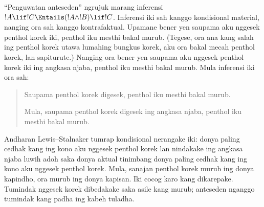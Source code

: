 \documentclass[../../../include/open-logic-section]{subfiles}
\begin{document}


``Penguwatan anteseden'' ngrujuk marang inferensi
$!A \lif !C \Entails (!A \land !B) \lif !C$. Inferensi iki sah
kanggo kondisional material, nanging ora sah kanggo kontrafaktual.
Upamane bener yen saupama aku nggesek penthol korek iki, penthol
iku mesthi bakal murub. (Tegese, ora ana kang salah ing penthol
korek utawa lumahing bungkus korek, aku ora bakal mecah penthol
korek, lan sapiturute.) Nanging ora bener yen saupama aku
nggesek penthol korek iki ing angkasa njaba, penthol iku mesthi
bakal murub. Mula inferensi iki ora sah:
\begin{quote}
  Saupama penthol korek digesek, penthol iku mesthi bakal murub.

  Mula, saupama penthol korek digesek ing angkasa njaba,
  penthol iku mesthi bakal murub.
\end{quote}

Andharan Lewis--Stalnaker tumrap kondisional nerangake iki:
donya paling cedhak kang ing kono aku nggesek penthol korek lan
nindakake ing angkasa njaba luwih adoh saka donya aktual tinimbang
donya paling cedhak kang ing kono aku nggesek penthol korek.
Mula, sanajan penthol korek murub ing donya kapindho, ora murub
ing donya kapisan. Iki cocog karo kang dikarepake.
Tumindak nggesek korek dibedakake saka asile kang murub; anteseden nganggo tumindak kang padha ing kabeh tuladha.
\end{document}
